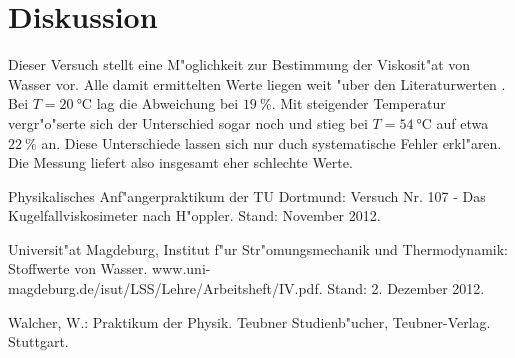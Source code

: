 \newpage
\section{Diskussion}
	\label{sec:diskussion}
	Dieser Versuch stellt eine M"oglichkeit zur Bestimmung der Viskosit"at von Wasser vor.
	Alle damit ermittelten Werte liegen weit "uber den Literaturwerten \cite{uni_magdeburg}.
	Bei $T = \SI{20}{\celsius}$ lag die Abweichung bei $\SI{19}{\percent}$.
	Mit steigender Temperatur vergr"o"serte sich der Unterschied sogar noch und stieg bei $T = \SI{54}{\celsius}$ auf etwa $\SI{22}{\percent}$ an.
	Diese Unterschiede lassen sich nur duch systematische Fehler erkl"aren.
	Die Messung liefert also insgesamt eher schlechte Werte.	

\begin{thebibliography}{9}
	 Physikalisches Anf"angerpraktikum der TU Dortmund: Versuch Nr. 107 - Das Kugelfallviskosimeter nach H"oppler. Stand: November 2012.

	 Universit"at Magdeburg, Institut f"ur Str"omungsmechanik und Thermodynamik: Stoffwerte von Wasser. www.uni-magdeburg.de/isut/LSS/Lehre/Arbeitsheft/IV.pdf. Stand: 2. Dezember 2012.

	 Walcher, W.: Praktikum der Physik. Teubner Studienb"ucher, Teubner-Verlag. Stuttgart.
\end{thebibliography}